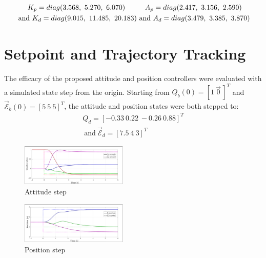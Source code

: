 \documentclass[a4paper, 10pt, conference]{ieeeconf}
\begin{document}
\begin{subequations}
\vspace{-3pt}
\begin{multline}
K_p=diag(3.568,~5.270,~6.070)\\~\text{and}~K_d=diag(9.015,~11.485,~20.183)
\end{multline}
\vspace{-22pt}
\begin{multline}
A_p=diag(2.417,~3.156,~2.590)\\~\text{and}~A_d=diag(3.479,~3.385,~3.870)
\end{multline}
\end{subequations}
\section{Setpoint and Trajectory Tracking}
\label{sec:setpoint}
The efficacy of the proposed attitude and position controllers were evaluated with a simulated state step from the origin. Starting from $Q_b(0)=[1~\vec{0}\hspace{2pt}]^T$ and $\vec{\mathcal{E}}_b(0)=[5~5~5]^T$, the attitude and position states were both stepped to:
\begin{multline}\label{eq:start-setpoint}
Q_d=[-0.33~0.22~-0.26~0.88]^T\\~\text{and}~\vec{\mathcal{E}}_d=[7.5~4~3]^T
\end{multline}
\par
\begin{figure}[tbp]
\centering
\includegraphics[width=0.45\textwidth]{figs/attitude-step}
\vspace{-8pt}
\caption{Attitude step}
\label{fig:attitude-step}
\end{figure}
\begin{figure}[tbp]
\vspace{-10pt}
\centering
\includegraphics[width=0.45\textwidth]{figs/position-step}
\vspace{-8pt}
\caption{Position step}
\label{fig:position-step}
\vspace{-18pt}
\end{figure}
\end{document}
